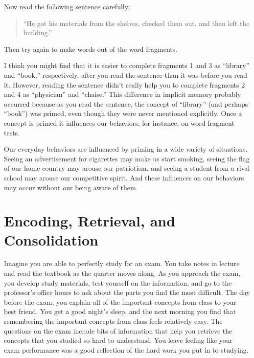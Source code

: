 \documentclass[
]{krantz}
\begin{document}
Now read the following sentence carefully:

\begin{quote}
``He got his materials from the shelves, checked them out, and then left the building.''
\end{quote}

Then try again to make words out of the word fragments.

I think you might find that it is easier to complete fragments 1 and 3 as ``library'' and ``book,'' respectively, after you read the sentence than it was before you read it. However, reading the sentence didn't really help you to complete fragments 2 and 4 as ``physician'' and ``chaise.'' This difference in implicit memory probably occurred because as you read the sentence, the concept of ``library'' (and perhaps ``book'') was primed, even though they were never mentioned explicitly. Once a concept is primed it influences our behaviors, for instance, on word fragment tests.

Our everyday behaviors are influenced by priming in a wide variety of situations. Seeing an advertisement for cigarettes may make us start smoking, seeing the flag of our home country may arouse our patriotism, and seeing a student from a rival school may arouse our competitive spirit. And these influences on our behaviors may occur without our being aware of them.

\hypertarget{encoding-retrieval-and-consolidation}{%
\section{Encoding, Retrieval, and Consolidation}\label{encoding-retrieval-and-consolidation}}

Imagine you are able to perfectly study for an exam. You take notes in lecture and read the textbook as the quarter moves along. As you approach the exam, you develop study materials, test yourself on the information, and go to the professor's office hours to ask about the parts you find the most difficult. The day before the exam, you explain all of the important concepts from class to your best friend. You get a good night's sleep, and the next morning you find that remembering the important concepts from class feels relatively easy. The questions on the exam include bits of information that help you retrieve the concepts that you studied so hard to understand. You leave feeling like your exam performance was a good reflection of the hard work you put in to studying.
\end{document}
